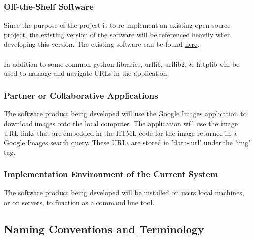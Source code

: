 \documentclass[12pt, titlepage]{article}
\begin{document}
\subsubsection{Off-the-Shelf Software}

Since the purpose of the project is to re-implement an existing open source project, the existing version of the software will be referenced heavily when developing this version. The existing software can be found \href{https://github.com/hardikvasa/google-images-download}{here}.
\\ \\
In addition to some common python libraries, urllib, urllib2, \& httplib will be used to manage and navigate URLs in the application.

\subsubsection{Partner or Collaborative Applications}

The software product being developed will use the Google Images application to download images onto the local computer. The application will use the image URL links that are embedded in the HTML code for the image returned in a Google Images search query. These URLs are stored in 'data-iurl' under the 'img' tag.

\subsubsection{Implementation Environment of the Current System}

The software product being developed will be installed on users local machines, or on servers, to function as a command line tool.

\newpage

\subsection{Naming Conventions and Terminology}
\end{document}
